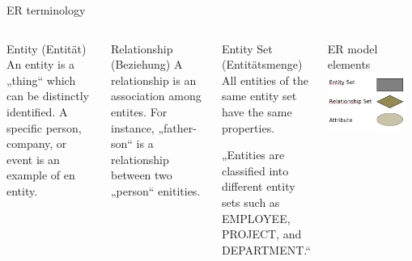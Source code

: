 \begin{frame}{ER terminology~\parencite[9--12]{chen1976}}
  \begin{columns}[T,onlytextwidth]
    \footnotesize
      \begin{block}{Entity (Entität)}
       An entity is a „thing“ which can be distinctly identified. A specific person, company, or event is an example of en entity.
      \end{block}

      \begin{alertblock}{Relationship (Beziehung)}
        A relationship is an association among entites. For instance, „father-son“ is a relationship between two „person“ enitities.
      \end{alertblock}

      \begin{exampleblock}{Entity Set (Entitätsmenge)}
        All entities of the same entity set have the same properties.
        
        „Entities are classified into different entity sets such as EMPLOYEE, PROJECT, and DEPARTMENT.“
      \end{exampleblock}




      \begin{block}{ER model elements}
      \includegraphics[width=0.9\textwidth]{img/er-modell.png}
      \end{block}
      

\end{columns}
\end{frame}
